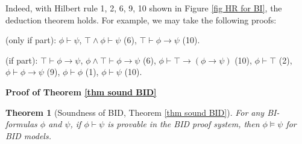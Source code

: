\documentclass[conference,compsoc, 10pt]{IEEEtran}
\newtheorem{theorem}{Theorem}[section]
\begin{document}
\begin{appendices}
		\vspace{0.2cm}
		
		Indeed, with Hilbert rule 1, 2, 6, 9, 10 shown in Figure \ref{fig HR for BI}, the deduction theorem holds. For example, we may take the following proofs:
		
		(only if part): $\phi\vdash\psi$, $\top\wedge\phi\vdash\psi$ (6), $\top\vdash\phi\rightarrow\psi$ (10).
		
		(if part): $\top\vdash\phi\rightarrow\psi$, $\phi\wedge\top\vdash\phi\rightarrow\psi$ (6), $\phi\vdash\top\rightarrow(\phi\rightarrow\psi)$ (10), $\phi\vdash\top$ (2), $\phi\vdash\phi\rightarrow\psi$ (9), $\phi\vdash\phi$ (1), $\phi\vdash\psi$ (10).	
		
		
		\vspace{0.5cm}
		
		\noindent\textbf{Proof of Theorem \ref{thm sound BID}}
		
		\begin{theorem}[Soundness of BID, Theorem \ref{thm sound BID}]
			For any BI-formulas $\phi$ and $\psi$, if $\phi\vdash\psi$ is provable in the BID proof system, then $\phi\models\psi$ for BID models.
		\end{theorem}
		

\end{appendices}
\end{document}
